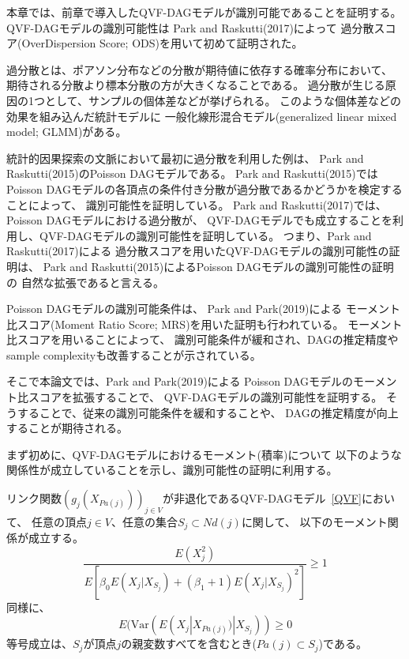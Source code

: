 

本章では、前章で導入したQVF-DAGモデル\cite{Park2017-hw}が識別可能であることを証明する。
QVF-DAGモデルの識別可能性は
Park and Raskutti(2017)\cite{Park2017-hw}によって
過分散スコア(OverDispersion Score; ODS)を用いて初めて証明された。

過分散とは、ポアソン分布などの分散が期待値に依存する確率分布において、
期待される分散より標本分散の方が大きくなることである。
過分散が生じる原因の1つとして、サンプルの個体差などが挙げられる。
このような個体差などの効果を組み込んだ統計モデルに
一般化線形混合モデル(generalized linear mixed model; GLMM)がある\cite{2012-iq}。

統計的因果探索の文脈において最初に過分散を利用した例は、
Park and Raskutti(2015)\cite{Park2015-tj}のPoisson DAGモデルである。
Park and Raskutti(2015)\cite{Park2015-tj}では
Poisson DAGモデルの各頂点の条件付き分散が過分散であるかどうかを検定することによって、
識別可能性を証明している。
Park and Raskutti(2017)\cite{Park2017-hw}では、
Poisson DAGモデルにおける過分散が、
QVF-DAGモデルでも成立することを利用し、QVF-DAGモデルの識別可能性を証明している。
つまり、Park and Raskutti(2017)\cite{Park2017-hw}による
過分散スコアを用いたQVF-DAGモデルの識別可能性の証明は、
Park and Raskutti(2015)\cite{Park2015-tj}によるPoisson DAGモデルの識別可能性の証明の
自然な拡張であると言える。

Poisson DAGモデルの識別可能条件は、
Park and Park(2019)\cite{Park2019-qy}による
モーメント比スコア(Moment Ratio Score; MRS)を用いた証明も行われている。
モーメント比スコアを用いることによって、
識別可能条件が緩和され、DAGの推定精度やsample complexityも改善することが示されている\cite{Park2019-qy}。

そこで本論文では、Park and Park(2019)\cite{Park2019-qy}による
Poisson DAGモデルのモーメント比スコアを拡張することで、
QVF-DAGモデルの識別可能性を証明する。
そうすることで、従来の識別可能条件\cite{Park2017-hw}を緩和することや、
DAGの推定精度が向上することが期待される。

まず初めに、QVF-DAGモデルにおけるモーメント(積率)について
以下のような関係性が成立していることを示し、識別可能性の証明に利用する。

\begin{prop} \label{prop:MRS}
  リンク関数$(g_j(X_{Pa(j)}))_{j \in V}$が非退化であるQVF-DAGモデル~\eqref{QVF}において、
  任意の頂点$j \in V$、任意の集合$S_j \subset \mathit{Nd}(j)$に関して、
  以下のモーメント関係が成立する。
  \begin{equation}
    \frac{E(X_j^2)}
    {E \left[ \beta_0 E(X_j | X_{S_j}) + (\beta_1 + 1)E(X_j | X_{S_j})^2 \right]}
    \geq 1
    \label{eq:MRS}
  \end{equation}
  同様に、
  \begin{equation}
    E(\mathrm{Var}( E(X_j | X_{Pa(j)}) | X_{S_j} )) \geq 0
  \end{equation}
  等号成立は、$S_j$が頂点$j$の親変数すべてを含むとき($Pa(j)\subset S_j$)である。
\end{prop}


